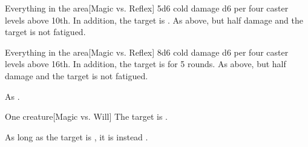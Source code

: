 \begin{spellheader}
    \spelldur{\durshort}
\end{spellheader}
\begin{spelleffects}
    \begin{spelltarget}{Everything in the area}[Magic vs. Reflex]
        \spellsuccess 5d6 cold damage \add d6 per four caster levels above 10th. In addition, the target is \fatigued.
        \spellfailure As above, but half damage and the target is not fatigued.
    \end{spelltarget}
\end{spelleffects}
\begin{spellfooter}
    \spellnotes \destructivespellnotes
\end{spellfooter}

\begin{spellheader}
\end{spellheader}
\begin{spelleffects}
    \begin{spelltarget}{Everything in the area}[Magic vs. Reflex]
        \spellsuccess 8d6 cold damage \add d6 per four caster levels above 16th. In addition, the target is \fatigued for 5 rounds.
        \spellfailure As above, but half damage and the target is not fatigued.
    \end{spelltarget}
\end{spelleffects}
\begin{spellfooter}
    \spellnotes As .
\end{spellfooter}

\begin{spellheader}
    \spellrng{\rngmed}
    \spelldur{\durshort}
\end{spellheader}
\begin{spelleffects}
    \begin{spelltarget}{One creature}[Magic vs. Will]
        \spellsuccess The target is \bewildered.

        As long as the target is \bloodied, it is instead \confused.
    \end{spelltarget}
\end{spelleffects}

